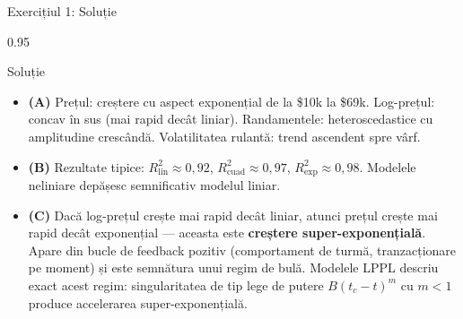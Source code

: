 \documentclass[9pt, aspectratio=169, t]{beamer}
\begin{document}
\begin{frame}{Exercițiul 1: Soluție}
    \begin{cminipage}{0.95\textwidth}
    \begin{exampleblock}{Soluție}
        {\small
        \begin{itemize}\setlength{\itemsep}{3pt}
            \item \textcolor{MainBlue}{\textbf{(A)}} Prețul: creștere cu aspect exponențial de la \$10k la \$69k. Log-prețul: concav în sus (mai rapid decât liniar). Randamentele: heteroscedastice cu amplitudine crescândă. Volatilitatea rulantă: trend ascendent spre vârf.
            \item \textcolor{MainBlue}{\textbf{(B)}} Rezultate tipice: $R^2_{\text{lin}} \approx 0{,}92$, $R^2_{\text{cuad}} \approx 0{,}97$, $R^2_{\text{exp}} \approx 0{,}98$. Modelele neliniare depășesc semnificativ modelul liniar.
            \item \textcolor{MainBlue}{\textbf{(C)}} Dacă log-prețul crește mai rapid decât liniar, atunci prețul crește mai rapid decât exponențial --- aceasta este \textbf{creștere super-exponențială}. Apare din bucle de feedback pozitiv (comportament de turmă, tranzacționare pe moment) și este semnătura unui regim de bulă. Modelele LPPL descriu exact acest regim: singularitatea de tip lege de putere $B(t_c - t)^m$ cu $m < 1$ produce accelerarea super-exponențială.
        \end{itemize}
        }
    \end{exampleblock}
    \end{cminipage}
\end{frame}
\end{document}
